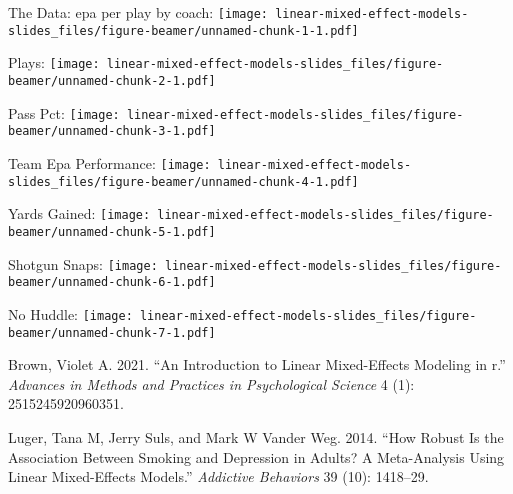\documentclass[
  ignorenonframetext,
]{beamer}
\newlength{\cslhangindent}
\newlength{\cslentryspacingunit} %
\newenvironment{CSLReferences}[2] %
 {%
  \setlength{\parindent}{0pt}
  \ifodd #1
  \let\oldpar\par
  \def\par{\hangindent=\cslhangindent\oldpar}
  \fi
  \setlength{\parskip}{#2\cslentryspacingunit}
 }%
 {}
\begin{document}
\begin{frame}{The Data:}
\protect\hypertarget{the-data}{}
epa per play by coach:
\texttt{[image: linear-mixed-effect-models-slides\_files/figure-beamer/unnamed-chunk-1-1.pdf]}
\end{frame}

\begin{frame}{Plays:}
\protect\hypertarget{plays}{}
\texttt{[image: linear-mixed-effect-models-slides\_files/figure-beamer/unnamed-chunk-2-1.pdf]}
\end{frame}

\begin{frame}{Pass Pct:}
\protect\hypertarget{pass-pct}{}
\texttt{[image: linear-mixed-effect-models-slides\_files/figure-beamer/unnamed-chunk-3-1.pdf]}
\end{frame}

\begin{frame}{Team Epa Performance:}
\protect\hypertarget{team-epa-performance}{}
\texttt{[image: linear-mixed-effect-models-slides\_files/figure-beamer/unnamed-chunk-4-1.pdf]}
\end{frame}

\begin{frame}{Yards Gained:}
\protect\hypertarget{yards-gained}{}
\texttt{[image: linear-mixed-effect-models-slides\_files/figure-beamer/unnamed-chunk-5-1.pdf]}
\end{frame}

\begin{frame}{Shotgun Snaps:}
\protect\hypertarget{shotgun-snaps}{}
\texttt{[image: linear-mixed-effect-models-slides\_files/figure-beamer/unnamed-chunk-6-1.pdf]}
\end{frame}

\begin{frame}{No Huddle:}
\protect\hypertarget{no-huddle}{}
\texttt{[image: linear-mixed-effect-models-slides\_files/figure-beamer/unnamed-chunk-7-1.pdf]}

\hypertarget{refs}{}
\begin{CSLReferences}{1}{0}
\leavevmode{}%
Brown, Violet A. 2021. {``An Introduction to Linear Mixed-Effects
Modeling in r.''} \emph{Advances in Methods and Practices in
Psychological Science} 4 (1): 2515245920960351.

\leavevmode{}%
Luger, Tana M, Jerry Suls, and Mark W Vander Weg. 2014. {``How Robust Is
the Association Between Smoking and Depression in Adults? A
Meta-Analysis Using Linear Mixed-Effects Models.''} \emph{Addictive
Behaviors} 39 (10): 1418--29.

\end{CSLReferences}
\end{frame}
\end{document}
